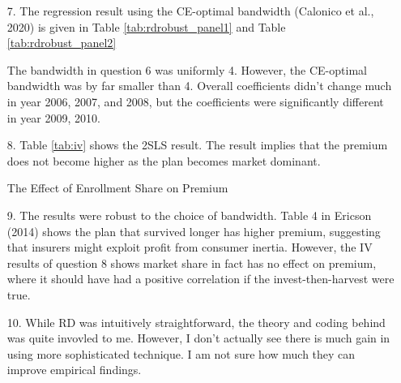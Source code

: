 \documentclass[12pt]{article}
\begin{document}
\begin{itemize}
\item[7.] The regression result using the CE-optimal bandwidth (Calonico et al., 2020) is given in Table \ref{tab:rdrobust_panel1} and Table \ref{tab:rdrobust_panel2}


The bandwidth in question 6 was uniformly 4. However, the CE-optimal bandwidth was by far smaller than 4. Overall coefficients didn't change much in year 2006, 2007, and 2008, but the coefficients were significantly different in year 2009, 2010.

\item[8.] Table \ref{tab:iv} shows the 2SLS result. The result implies that the premium does not become higher as the plan becomes market dominant.

\begin{table}[ht]
	
	\caption{The Effect of Enrollment Share on Premium}
	\label{tab:iv}
\end{table}


\item[9.] The results were robust to the choice of bandwidth. Table 4 in Ericson (2014) shows the plan that survived longer has higher premium, suggesting that insurers might exploit profit from consumer inertia. However, the IV results of question 8 shows market share in fact has no effect on premium, where it should have had a positive correlation if the invest-then-harvest were true. 

\item[10.] While RD was intuitively straightforward, the theory and coding behind was quite invovled to me. However, I don't actually see there is much gain in using more sophisticated technique. I am not sure how much they can improve empirical findings.


\end{itemize}
\end{document}
